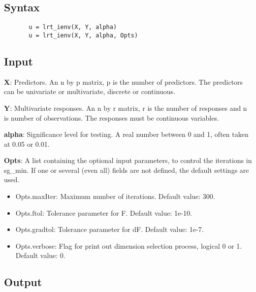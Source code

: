 \documentclass[a4paper,11pt,openany]{memoir}
\begin{document}
\subsection*{Syntax}


\begin{verbatim}       u = lrt_ienv(X, Y, alpha)
       u = lrt_ienv(X, Y, alpha, Opts)\end{verbatim}
    

\subsection*{Input}

\begin{par}
\textbf{X}: Predictors. An n by p matrix, p is the number of predictors. The predictors can be univariate or multivariate, discrete or continuous.
\end{par} \vspace{1em}
\begin{par}
\textbf{Y}: Multivariate responses. An n by r matrix, r is the number of responses and n is number of observations. The responses must be continuous variables.
\end{par} \vspace{1em}
\begin{par}
\textbf{alpha}: Significance level for testing.  A real number between 0 and 1, often taken at 0.05 or 0.01.
\end{par} \vspace{1em}
\begin{par}
\textbf{Opts}: A list containing the optional input parameters, to control the iterations in sg\_min. If one or several (even all) fields are not defined, the default settings are used.
\end{par} \vspace{1em}
\begin{itemize}
\setlength{\itemsep}{-1ex}
   \item Opts.maxIter: Maximum number of iterations.  Default value: 300.
   \item Opts.ftol: Tolerance parameter for F.  Default value: 1e-10.
   \item Opts.gradtol: Tolerance parameter for dF.  Default value: 1e-7.
   \item Opts.verbose: Flag for print out dimension selection process, logical 0 or 1. Default value: 0.
\end{itemize}


\subsection*{Output}
\end{document}
